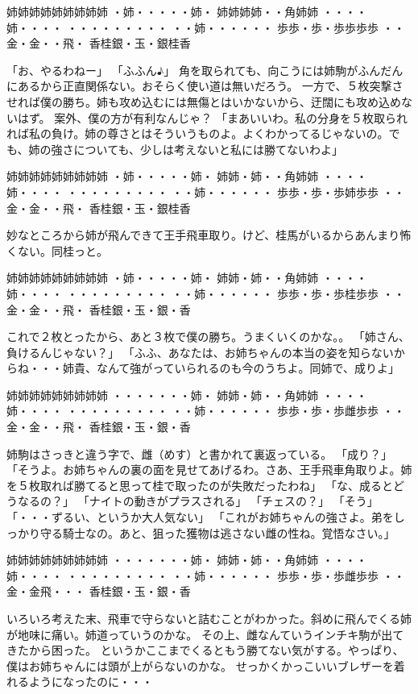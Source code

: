姉姉姉姉姉姉姉姉姉
・姉・・・・・姉・
姉姉姉姉・・角姉姉
・・・・姉・・・・
・・・・・・・・・
・・姉・・・・・・
歩歩・歩・歩歩歩歩
・・金・金・・飛・
香桂銀・玉・銀桂香

「お、やるわねー」
「ふふん♪」
角を取られても、向こうには姉駒がふんだんにあるから正直関係ない。おそらく使い道は無いだろう。
一方で、５枚突撃させれば僕の勝ち。姉も攻め込むには無傷とはいかないから、迂闊にも攻め込めないはず。
案外、僕の方が有利なんじゃ？
「まあいいわ。私の分身を５枚取られれば私の負け。姉の尊さとはそういうものよ。よくわかってるじゃないの。でも、姉の強さについても、少しは考えないと私には勝てないわよ」

姉姉姉姉姉姉姉姉姉
・姉・・・・・姉・
姉姉・姉・・角姉姉
・・・・姉・・・・
・・・・・・・・・
・・姉・・・・・・
歩歩・歩・歩姉歩歩
・・金・金・・飛・
香桂銀・玉・銀桂香

妙なところから姉が飛んできて王手飛車取り。けど、桂馬がいるからあんまり怖くない。同桂っと。

姉姉姉姉姉姉姉姉姉
・姉・・・・・姉・
姉姉・姉・・角姉姉
・・・・姉・・・・
・・・・・・・・・
・・姉・・・・・・
歩歩・歩・歩桂歩歩
・・金・金・・飛・
香桂銀・玉・銀・香

これで２枚とったから、あと３枚で僕の勝ち。うまくいくのかな。。
「姉さん、負けるんじゃない？」
「ふふ、あなたは、お姉ちゃんの本当の姿を知らないからね・・・姉貴、なんて強がっていられるのも今のうちよ。同姉で、成りよ」

姉姉姉姉姉姉姉姉姉
・・・・・・・姉・
姉姉・姉・・角姉姉
・・・・姉・・・・
・・・・・・・・・
・・姉・・・・・・
歩歩・歩・歩雌歩歩
・・金・金・・飛・
香桂銀・玉・銀・香

姉駒はさっきと違う字で、雌（めす）と書かれて裏返っている。
「成り？」
「そうよ。お姉ちゃんの裏の面を見せてあげるわ。さあ、王手飛車角取りよ。姉を５枚取れば勝てると思って桂で取ったのが失敗だったわね」
「な、成るとどうなるの？」
「ナイトの動きがプラスされる」
「チェスの？」
「そう」
「・・・ずるい、というか大人気ない」
「これがお姉ちゃんの強さよ。弟をしっかり守る騎士なの。あと、狙った獲物は逃さない雌の性ね。覚悟なさい。」

姉姉姉姉姉姉姉姉姉
・・・・・・・姉・
姉姉・姉・・角姉姉
・・・・姉・・・・
・・・・・・・・・
・・姉・・・・・・
歩歩・歩・歩雌歩歩
・・金・金飛・・・
香桂銀・玉・銀・香

いろいろ考えた末、飛車で守らないと詰むことがわかった。斜めに飛んでくる姉が地味に痛い。姉道っていうのかな。
その上、雌なんていうインチキ駒が出てきたから困った。
というかここまでくるともう勝てない気がする。やっぱり、僕はお姉ちゃんには頭が上がらないのかな。
せっかくかっこいいブレザーを着れるようになったのに・・・

